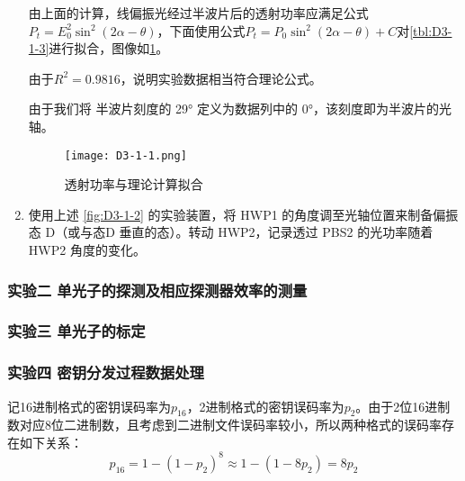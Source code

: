 \documentclass[dvipsnames, svgnames,a4paper,11pt]{article}
\begin{document}
\begin{enumerate}
			由上面的计算，线偏振光经过半波片后的透射功率应满足公式 $P_t = E_0^2 \sin^2(2 \alpha - \theta)$，下面使用公式$ P_t = P_0 \sin^2(2\alpha - \theta) + C $对\cref{tbl:D3-1-3}进行拟合，图像如\cref{fig:D3-1-1}。

			由于$R^2 = 0.9816$，说明实验数据相当符合理论公式。

			由于我们将 半波片刻度的 29° 定义为数据列中的 0°，该刻度即为半波片的光轴。

			\begin{figure}[H]
				\centering
				\texttt{[image: D3-1-1.png]}
				\caption{透射功率与理论计算拟合}
				\label{fig:D3-1-1}
			\end{figure}



			\item 使用上述 \cref{fig:D3-1-2} 的实验装置，将 HWP1 的角度调至光轴位置来制备偏振态 D（或与态D 垂直的态）。转动 HWP2，记录透过 PBS2 的光功率随着 HWP2 角度的变化。
			
		\end{enumerate}




















	\subsubsection{实验二 \quad 单光子的探测及相应探测器效率的测量}

	\subsubsection{实验三 \quad 单光子的标定}

	\subsubsection{实验四 \quad 密钥分发过程数据处理}
			

		记16进制格式的密钥误码率为$p_{16}$，2进制格式的密钥误码率为$p_{2}$。由于2位16进制数对应8位二进制数，且考虑到二进制文件误码率较小，所以两种格式的误码率存在如下关系：
		\[
			p_{16} = 1 - (1 - p_{2})^8 \approx 1 - (1 - 8p_{2}) = 8p_{2}
		\]
\end{document}

